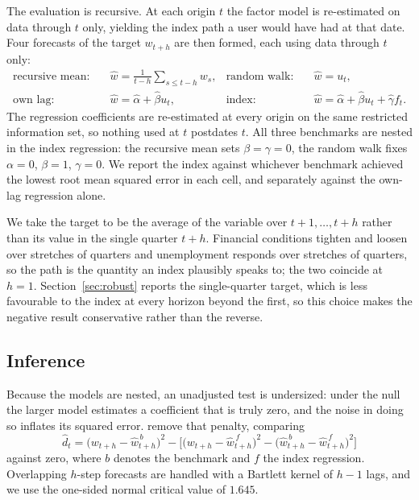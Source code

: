 \documentclass[12pt]{article}
\begin{document}
The evaluation is recursive. At each origin $t$ the factor model is
re-estimated on data through $t$ only, yielding the index path a user would
have had at that date. Four forecasts of the target $w_{t+h}$ are then formed,
each using data through $t$ only:
\begin{align}
\text{recursive mean:} \quad & \widehat{w} = \textstyle\frac{1}{t-h}\sum_{s \le t-h} w_{s},
& \text{random walk:} \quad & \widehat{w} = u_t, \\
\text{own lag:} \quad & \widehat{w} = \hat\alpha + \hat\beta u_t,
& \text{index:} \quad & \widehat{w} = \hat\alpha + \hat\beta u_t + \hat\gamma f_t .
\label{eq:pred}
\end{align}
The regression coefficients are re-estimated at every origin on the same
restricted information set, so nothing used at $t$ postdates $t$. All three
benchmarks are nested in the index regression: the recursive mean sets
$\beta = \gamma = 0$, the random walk fixes $\alpha = 0$, $\beta = 1$,
$\gamma = 0$. We report the index against whichever benchmark achieved the
lowest root mean squared error in each cell, and separately against the own-lag
regression alone.

We take the target to be the average of the variable over $t+1, \dots, t+h$
rather than its value in the single quarter $t+h$. Financial conditions tighten
and loosen over stretches of quarters and unemployment responds over stretches
of quarters, so the path is the quantity an index plausibly speaks to; the two
coincide at $h = 1$. Section~\ref{sec:robust} reports the single-quarter
target, which is less favourable to the index at every horizon beyond the
first, so this choice makes the negative result conservative rather than the
reverse.

\subsection{Inference}

Because the models are nested, an unadjusted \citet{diebold1995} test is
undersized: under the null the larger model estimates a coefficient that is
truly zero, and the noise in doing so inflates its squared error.
\citet{clark2007} remove that penalty, comparing
\begin{equation}
\hat d_t = \big(w_{t+h} - \widehat{w}^{\,b}_{t+h}\big)^2
 - \Big[\big(w_{t+h} - \widehat{w}^{\,f}_{t+h}\big)^2
 - \big(\widehat{w}^{\,b}_{t+h} - \widehat{w}^{\,f}_{t+h}\big)^2\Big]
\end{equation}
against zero, where $b$ denotes the benchmark and $f$ the index regression.
Overlapping $h$-step forecasts are handled with a Bartlett kernel of $h-1$
lags, and we use the one-sided normal critical value of $1.645$.
\end{document}
